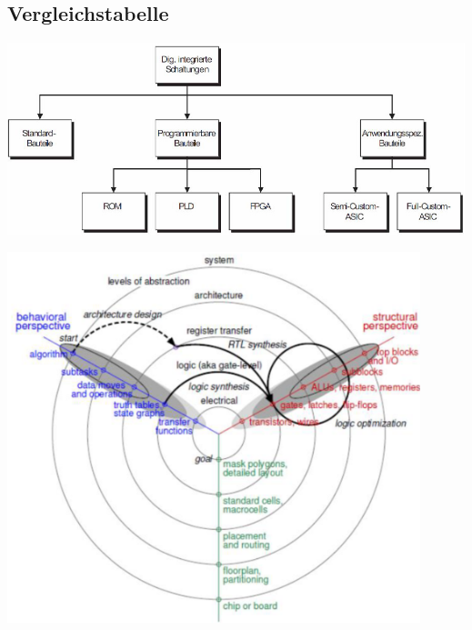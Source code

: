 %
%

%
%

\subsection{Vergleichstabelle}
\begin{minipage}{0.55\linewidth}
\includegraphics[width=\textwidth]{images/devicecomparetables}
\end{minipage}
\hfill
\begin{minipage}{0.44\linewidth}
\includegraphics[width=0.9\textwidth]{images/abstraktion.png}
\end{minipage}

